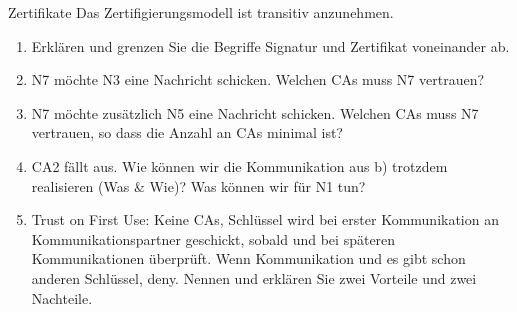 \documentclass{article}
\begin{document}
\begin{exercise}{Zertifikate}
  Das Zertifigierungsmodell ist transitiv anzunehmen.

  \begin{enumerate}
    \item Erklären und grenzen Sie die Begriffe Signatur und Zertifikat voneinander ab.
    \item N7 möchte N3 eine Nachricht schicken. Welchen CAs muss N7 vertrauen?
    \item N7 möchte zusätzlich N5 eine Nachricht schicken. Welchen CAs muss N7 vertrauen, so dass die Anzahl an CAs minimal ist?
    \item CA2 fällt aus. Wie können wir die Kommunikation aus b) trotzdem realisieren (Was \& Wie)? Was können wir für N1 tun?
    \item Trust on First Use: Keine CAs, Schlüssel wird bei erster Kommunikation an Kommunikationspartner geschickt, sobald und bei späteren Kommunikationen überprüft. Wenn Kommunikation und es gibt schon anderen Schlüssel, deny. Nennen und erklären Sie zwei Vorteile und zwei Nachteile.
  \end{enumerate}

  \begin{solution}
  \end{solution}
\end{exercise}
\end{document}
